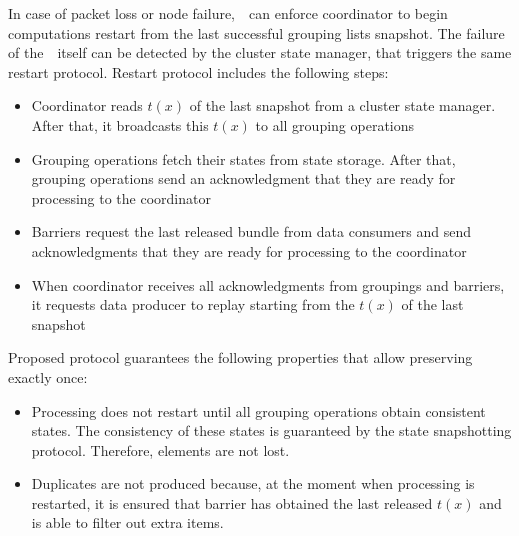 In case of packet loss or node failure,~\Acker\ can enforce coordinator to begin computations restart from the last successful grouping lists snapshot. The failure of the~\Acker\ itself can be detected by the cluster state manager, that triggers the same restart protocol. Restart protocol includes the following steps:

\begin{itemize}
    \item Coordinator reads $t(x)$ of the last snapshot from a cluster state manager. After that, it broadcasts this $t(x)$ to all grouping operations
    \item Grouping operations fetch their states from state storage. After that, grouping operations send an acknowledgment that they are ready for processing to the coordinator 
    \item Barriers request the last released bundle from data consumers and send acknowledgments that they are ready for processing to the coordinator
    \item When coordinator receives all acknowledgments from groupings and barriers, it requests data producer to replay starting from the $t(x)$ of the last snapshot  
\end{itemize}

Proposed protocol guarantees the following properties that allow preserving exactly once:

\begin{itemize}
    \item Processing does not restart until all grouping operations obtain consistent states. The consistency of these states is guaranteed by the state snapshotting protocol. Therefore, elements are not lost.
    \item Duplicates are not produced because, at the moment when processing is restarted, it is ensured that barrier has obtained the last released $t(x)$ and is able to filter out extra items.
\end{itemize}